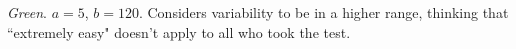 \documentclass[12pt]{article}
\begin{document}
\noindent \emph{Green}. $a=5$, $b=120$.  Considers variability to be in a higher range, thinking that ``extremely easy" doesn't apply to all who took the test.

%
\end{document}
